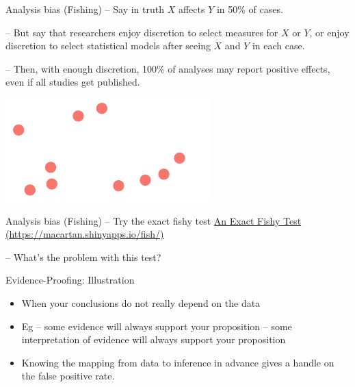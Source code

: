 \documentclass[
  11pt,
  ignorenonframetext,
]{beamer}
\begin{document}
\begin{frame}{Analysis bias (Fishing)}
\protect\hypertarget{analysis-bias-fishing-1}{}
-- Say in truth \(X\) affects \(Y\) in 50\% of cases.

-- But say that researchers enjoy discretion to select measures for
\(X\) or \(Y\), or enjoy discretion to select statistical models after
seeing \(X\) and \(Y\) in each case.

-- Then, with enough discretion, 100\% of analyses may report positive
effects, even if all studies get published.

\includegraphics{5.2_process_files/figure-beamer/unnamed-chunk-5-1.pdf}
\end{frame}

\begin{frame}{Analysis bias (Fishing)}
\protect\hypertarget{analysis-bias-fishing-2}{}
-- Try the exact fishy test
\href{https://macartan.shinyapps.io/fish/}{An Exact Fishy Test
(https://macartan.shinyapps.io/fish/)}

-- What's the problem with this test?
\end{frame}

\begin{frame}{Evidence-Proofing: Illustration}
\protect\hypertarget{evidence-proofing-illustration}{}
\begin{itemize}
\item
  When your conclusions do not really depend on the data
\item
  Eg -- some evidence will always support your proposition -- some
  interpretation of evidence will always support your proposition
\item
  Knowing the mapping from data to inference in advance gives a handle
  on the false positive rate.
\end{itemize}
\end{frame}
\end{document}

